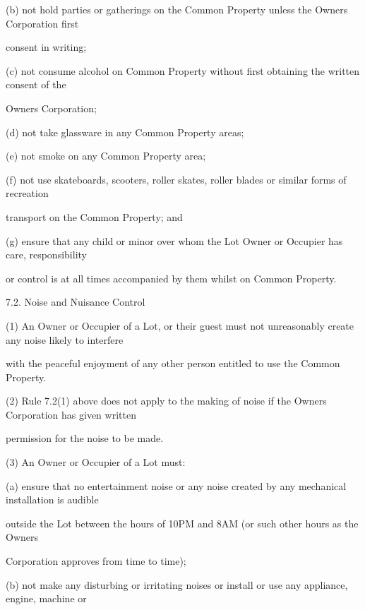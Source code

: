 \documentclass{article}
\begin{document}
{\fontsize{9.962}{1}(b) not hold parties or gatherings on the Common Property unless the Owners Corporation first }

{\fontsize{10.02}{1}consent in writing; }

{\fontsize{9.962}{1}(c) not consume alcohol on Common Property without first obtaining the written consent of the }

{\fontsize{10.02}{1}Owners Corporation; }

{\fontsize{9.962}{1}(d) not take glassware in any Common Property areas; }

{\fontsize{9.962}{1}(e) not smoke on any Common Property area; }

{\fontsize{9.962}{1}(f) not use skateboards, scooters, roller skates, roller blades or similar forms of recreation }

{\fontsize{10.02}{1}transport on the Common Property; and }

{\fontsize{9.962}{1}(g) ensure that any child or minor over whom the Lot Owner or Occupier has care, responsibility }

{\fontsize{10.02}{1}or control is at all times accompanied by them whilst on Common Property. }

{\fontsize{9.99}{1}7.2. Noise and Nuisance Control }

{\fontsize{9.962}{1}(1) An Owner or Occupier of a Lot, or their guest must not unreasonably create any noise likely to interfere }

{\fontsize{10.02}{1}with the peaceful enjoyment of any other person entitled to use the Common Property. }

{\fontsize{9.962}{1}(2) Rule 7.2(1) above does not apply to the making of noise if the Owners Corporation has given written }

{\fontsize{10.02}{1}permission for the noise to be made. }

{\fontsize{9.962}{1}(3) An Owner or Occupier of a Lot must: }

{\fontsize{9.962}{1}(a) ensure that no entertainment noise or any noise created by any mechanical installation is audible }

{\fontsize{10.02}{1}outside the Lot between the hours of 10PM and 8AM (or such other hours as the Owners }

{\fontsize{10.02}{1}Corporation approves from time to time); }

{\fontsize{9.962}{1}(b) not make any disturbing or irritating noises or install or use any appliance, engine, machine or }
\end{document}
